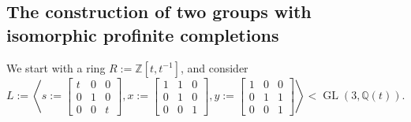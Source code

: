 \documentclass[11pt]{amsart}
\theoremstyle{definition}
\DeclareMathOperator{\GL}{GL}
\newcommand{\ZZ}{\mathbb{Z}}
\newcommand{\QQ}{\mathbb{Q}}
\begin{document}
\subsection{The construction of two groups with isomorphic profinite completions}

 We start with a ring $R:=\ZZ[t,t^{-1}]$, and consider
 $$L:=\left< s:=
 \begin{bmatrix}
 t & 0 & 0 \\ 0 & 1 & 0 \\ 0 & 0 & t
 \end{bmatrix}, x:= \begin{bmatrix}
 1 & 1 & 0 \\ 0 & 1 & 0 \\ 0 & 0 & 1
 \end{bmatrix}, y:= 
 \begin{bmatrix}
 1 & 0 & 0 \\ 0 & 1 & 1 \\ 0 & 0 & 1
 \end{bmatrix}
 \right> < \GL(3,\QQ(t)).$$
\end{document}
